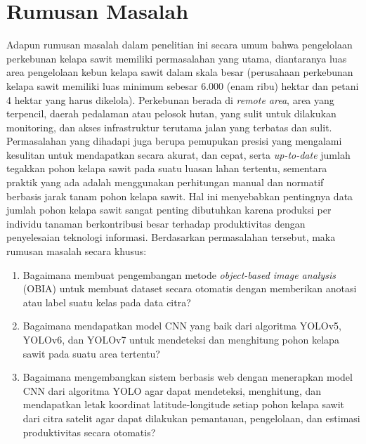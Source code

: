 \section{Rumusan Masalah}
\label{sec:3-Rumusanmasalah}
\hspace{1,2cm}Adapun rumusan masalah dalam penelitian ini secara umum bahwa pengelolaan perkebunan kelapa sawit memiliki permasalahan yang utama, diantaranya luas area pengelolaan kebun kelapa sawit dalam skala besar (perusahaan perkebunan kelapa sawit memiliki luas minimum sebesar 6.000 (enam ribu) hektar dan petani 4 hektar yang harus dikelola). Perkebunan berada di \textit{remote area}, area yang terpencil, daerah pedalaman atau pelosok hutan, yang sulit untuk dilakukan monitoring, dan akses infrastruktur terutama jalan yang terbatas dan sulit. Permasalahan yang dihadapi juga berupa pemupukan presisi yang mengalami kesulitan untuk mendapatkan secara akurat, dan cepat, serta \textit{up-to-date} jumlah tegakkan pohon kelapa sawit pada suatu luasan lahan tertentu, sementara praktik yang ada adalah menggunakan perhitungan manual dan normatif berbasis jarak tanam pohon kelapa sawit. Hal ini menyebabkan pentingnya data jumlah pohon kelapa sawit sangat penting dibutuhkan karena produksi per individu tanaman berkontribusi besar terhadap produktivitas dengan penyelesaian teknologi informasi. Berdasarkan permasalahan tersebut, maka rumusan masalah secara khusus:  
\begin{enumerate}
	\item Bagaimana membuat pengembangan metode \textit{object-based image analysis} (OBIA) untuk membuat dataset secara otomatis dengan memberikan anotasi atau label suatu kelas pada data citra?
	\item Bagaimana mendapatkan model CNN yang baik dari algoritma YOLOv5, YOLOv6, dan YOLOv7 untuk mendeteksi dan menghitung pohon kelapa sawit pada suatu area tertentu?
	\item Bagaimana mengembangkan sistem berbasis web dengan menerapkan model CNN dari algoritma YOLO agar dapat mendeteksi, menghitung, dan mendapatkan letak koordinat latitude-longitude setiap pohon kelapa sawit dari citra satelit agar dapat dilakukan pemantauan, pengelolaan, dan estimasi produktivitas secara otomatis?
\end{enumerate}

